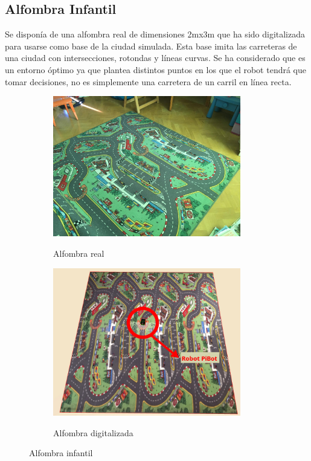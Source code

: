 \documentclass{report}
\begin{document}
\subsection{Alfombra Infantil}
Se disponía de una alfombra real de dimensiones 2mx3m que ha sido digitalizada para usarse como base de la ciudad simulada. Esta base imita las carreteras de una ciudad con intersecciones, rotondas y líneas curvas. Se ha considerado que es un entorno óptimo ya que plantea distintos puntos en los que el robot tendrá que tomar decisiones, no es simplemente una carretera de un carril en línea recta.

\renewcommand{\figurename}{Figura}		
\begin{figure}[!h]
\centering
  \begin{subfigure}[b]{0.49\textwidth}
  \centering
    \includegraphics[width=0.9\textwidth, height=0.7\textwidth]{images/cap4/alfombra-real.jpeg}
    \label{fig:f1}
    \caption{Alfombra real}
  \end{subfigure}
  \hfill
  \begin{subfigure}[b]{0.49\textwidth}
  \centering
    \includegraphics[width=0.9\textwidth, height=0.7\textwidth]{images/cap4/alfombra.jpg}
    \label{fig:f2}
    \caption{Alfombra digitalizada}
  \end{subfigure}
  \caption{Alfombra infantil}
\end{figure}
\end{document}
